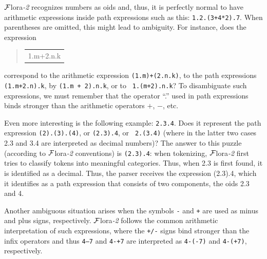 \documentclass[11pt]{article}
\newenvironment{qrules}{\begin{quote}\tt\begin{tabular}[t]{l}}%
{\end{tabular}\end{quote}}
\newcommand{\FLORA}{{\mbox{\sc ${\cal F}${lora}\rm\emph{-2}}}\xspace}
\begin{document}
\FLORA recognizes numbers as oids and, thus, it is perfectly normal to have
arithmetic expressions inside path expressions such as this:
{\tt 1.2.(3+4*2).7}. When parentheses are omitted, this might lead to
ambiguity.
For instance, does the expression
\begin{qrules}
1.m+2.n.k
\end{qrules}
correspond to
the arithmetic expression {\tt (1.m)+(2.n.k)}, to
the path expressions {\tt (1.m+2.n).k}, by {\tt (1.m + 2).n.k}, or to {\tt
  1.(m+2).n.k}? To disambiguate such expressions, we must remember that the
operator ``.'' used in path expressions binds stronger than the
arithmetic operators $+$, $-$, etc.

Even more interesting is the following example: {\tt 2.3.4}. Does it
represent the path expression {\tt (2).(3).(4)}, or {\tt (2.3).4}, or {\tt
  2.(3.4)} (where in the latter two cases 2.3 and 3.4 are interpreted as
decimal numbers)? The answer to this puzzle (according to \FLORA conventions)
is {\tt (2.3).4}: when
tokenizing, \FLORA first tries to classify tokens into meaningful
categories. Thus, when 2.3 is first found, it is identified as a
decimal. Thus, the parser receives the expression (2.3).4, which it
identifies as a path expression that consists of two components, the oids
2.3 and 4.

Another ambiguous situation arises when the symbols {\tt -} and {\tt +} are
used as minus and plus
signs, respectively. \FLORA follows the common arithmetic interpretation of
such expressions, where the {\tt +/-} signs bind stronger than the infix
operators and thus
{\tt 4--7} and {\tt 4-+7} are interpreted as {\tt 4-(-7)} and {\tt 4-(+7)},
respectively.
\end{document}
